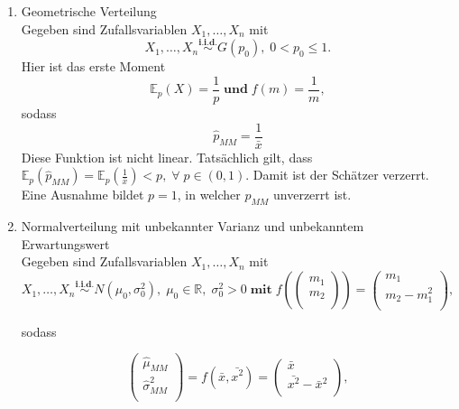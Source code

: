 \documentclass[10pt]{article}
\newcommand{\FZV}{X_1, \ldots, X_n} %
\newcommand{\IR}{\mathbb{R}} %
\newcommand{\EW}{\mathbb{E}} %
\newenvironment{BSP}[1][]
{\begin{Beispiel}[frametitle=#1]}{\end{Beispiel}}
\begin{document}
\begin{enumerate}
\begin{BSP}[Beispiel 1.3.3 (Erwartungstreue)]
\begin{enumerate}[label = (\roman*)]
			\item Geometrische Verteilung \\
			Gegeben sind Zufallsvariablen $\FZV$ mit
			\begin{equation*}
				\FZV \overset{\textbf{i.i.d.}}{\sim} G(p_0), \; 0 < p_0 \leq 1.
			\end{equation*} 
			Hier ist das erste Moment
			\begin{equation*}
				\EW_p(X) = \frac{1}{p} \; \textbf{und} \;			f(m)=\frac{1}{m},
			\end{equation*}
			sodass
			\begin{equation*}
				\hat{p}_{MM} = \frac{1}{\bar{x}}
			\end{equation*}
			Diese Funktion ist nicht linear. Tatsächlich gilt, dass $\EW_p(\hat{p}_{MM}) = \EW_p (\frac{1}{\bar{x}}) < p, \; \forall  \; p \in (0,1)$. Damit ist der Schätzer verzerrt. Eine Ausnahme bildet $ p = 1 $, in welcher $\hat{p}_{MM}$  unverzerrt ist.
			
			\item Normalverteilung mit unbekannter Varianz und unbekanntem Erwartungswert\\
			Gegeben sind Zufallsvariablen $\FZV$ mit
			\begin{equation*}
				\FZV \overset{\textbf{i.i.d.}} {\sim} N(\mu_0,\sigma_0^2),\; \mu_0 \in \IR, \; \sigma_0^2 >0 \; \textbf{mit} \; 	f(\left(
				\begin{array}{c}
					m_1\\
					m_2\\
				\end{array}
				\right)) = 
				\left(
				\begin{array}{c}
					m_1\\
					m_2 - m_1^2\\
				\end{array}
				\right),
			\end{equation*} 
			
			sodass
			
			\begin{equation*}
				\left(
				\begin{array}{c}
					\hat{\mu}_{MM}\\
					\hat{\sigma}^2_{MM}\\
				\end{array}
				\right) = 
				f(\bar{x}, \bar{x^2})=
				\left(
				\begin{array}{c}
					\bar{x}\\
					\bar{x^2}-\bar{x}^2\\
				\end{array}
				\right),
			\end{equation*}
			

\end{enumerate}
\end{BSP}
\end{enumerate}
\end{document}

